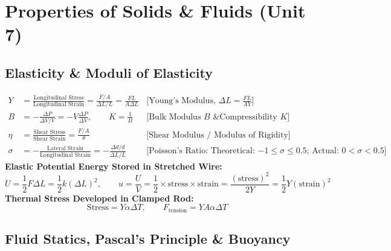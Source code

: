 \documentclass[11pt,a4paper]{article}
\begin{document}
\newpage

\section{Properties of Solids \& Fluids (Unit 7)}

\subsection{Elasticity \& Moduli of Elasticity}

\begin{formulabox}
\begin{align}
  Y &= \frac{\text{Longitudinal Stress}}{\text{Longitudinal Strain}} = \frac{F/A}{\Delta L/L} = \frac{F L}{A \Delta L} && \text{[Young's Modulus, $\Delta L = \frac{F L}{A Y}$]} \\
  B &= -\frac{\Delta P}{\Delta V / V} = -V\frac{\Delta P}{\Delta V}, \qquad K = \frac{1}{B} && \text{[Bulk Modulus $B$ \& Compressibility $K$]} \\
  \eta &= \frac{\text{Shear Stress}}{\text{Shear Strain}} = \frac{F/A}{\theta} && \text{[Shear Modulus / Modulus of Rigidity]} \\
  \sigma &= -\frac{\text{Lateral Strain}}{\text{Longitudinal Strain}} = -\frac{\Delta d / d}{\Delta L / L} && \text{[Poisson's Ratio: Theoretical: $-1 \le \sigma \le 0.5$; Actual: $0 < \sigma < 0.5$]}
\end{align}
\textbf{Elastic Potential Energy Stored in Stretched Wire:}
\begin{equation}
  U = \frac{1}{2} F \Delta L = \frac{1}{2} k (\Delta L)^2, \qquad u = \frac{U}{V} = \frac{1}{2}\times\text{stress}\times\text{strain} = \frac{(\text{stress})^2}{2Y} = \frac{1}{2}Y(\text{strain})^2
\end{equation}
\textbf{Thermal Stress Developed in Clamped Rod:}
\begin{equation}
  \text{Stress} = Y\alpha\Delta T, \qquad F_{\text{tension}} = Y A \alpha \Delta T
\end{equation}
\end{formulabox}

\subsection{Fluid Statics, Pascal's Principle \& Buoyancy}
\end{document}
